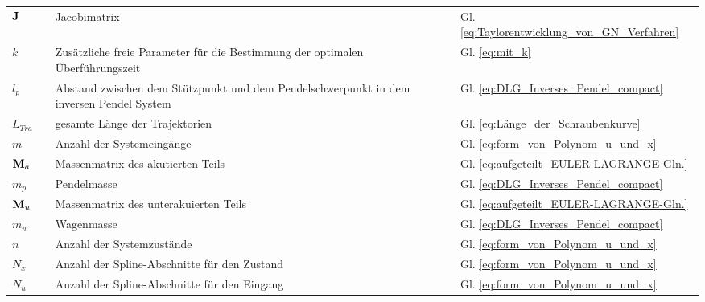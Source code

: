 \begin{small}
\begin{supertabular}{lcp{0.62\textwidth}cp{0.19\textwidth}}
		$\mathbf{J}$ && Jacobimatrix && Gl. \ref{eq:Taylorentwicklung_von_GN_Verfahren}\\
		$k$ && Zusätzliche freie Parameter für die Bestimmung der optimalen Überführungszeit && Gl. \ref{eq:mit_k}\\
		$l_{p}$ && Abstand zwischen dem Stützpunkt und dem Pendelschwerpunkt in dem inversen Pendel System && Gl. \ref{eq:DLG_Inverses_Pendel_compact}\\
		$L_{Tra}$ && gesamte Länge der Trajektorien && Gl. \ref{eq:Länge_der_Schraubenkurve}\\
		$m$ && Anzahl der Systemeingänge && Gl. \ref{eq:form_von_Polynom_u_und_x}\\
		$\mathbf{M}_{a}$ && Massenmatrix des akutierten Teils && Gl. \ref{eq:aufgeteilt_EULER-LAGRANGE-Gln.}\\
		$m_{p}$ && Pendelmasse && Gl. \ref{eq:DLG_Inverses_Pendel_compact}\\
		$\mathbf{M}_{u}$ && Massenmatrix des unterakuierten Teils && Gl. \ref{eq:aufgeteilt_EULER-LAGRANGE-Gln.}\\
		$m_{w}$ && Wagenmasse  && Gl. \ref{eq:DLG_Inverses_Pendel_compact}\\
		$n$ && Anzahl der Systemzustände && Gl. \ref{eq:form_von_Polynom_u_und_x}\\
		$N_{x}$ && Anzahl der Spline-Abschnitte für den Zustand && Gl. \ref{eq:form_von_Polynom_u_und_x}\\
		$N_{u}$ && Anzahl der Spline-Abschnitte für den Eingang && Gl. \ref{eq:form_von_Polynom_u_und_x}\\

\end{supertabular}
\end{small}
